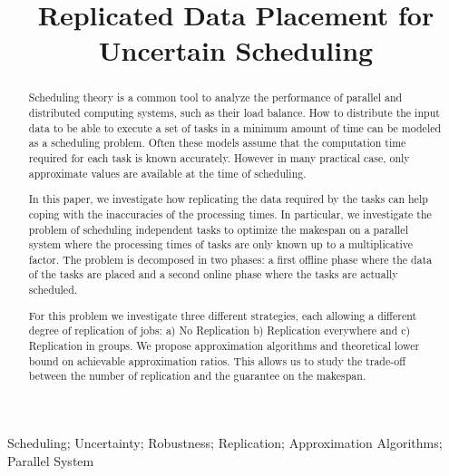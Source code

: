 \documentclass[10pt, conference, compsocconf]{IEEEtran}
\begin{document}
\title{Replicated Data Placement for Uncertain Scheduling}


\author{
}

\maketitle


\begin{abstract}
  Scheduling theory is a common tool to analyze the
  performance of parallel and distributed computing systems, such as their load
  balance. How to distribute the input data to be able to execute a
  set of tasks in a minimum amount of time can be modeled as a
  scheduling problem. Often these models assume that the computation
  time required for each task is known accurately. However in many
  practical case, only approximate values are available at the time of
  scheduling.

  In this paper, we investigate how replicating the data required by
  the tasks can help coping with the inaccuracies of the processing
  times. In particular, we investigate the problem of scheduling
  independent tasks to optimize the makespan on a parallel system
  where the processing times of tasks are only known up to a
  multiplicative factor. The problem is decomposed in two phases: a
  first offline phase where the data of the tasks are placed and a second
  online phase where the tasks are actually scheduled.

  For this problem we investigate three different strategies, each
  allowing a different degree of replication of jobs: a) No
  Replication b) Replication everywhere and c) Replication in
  groups. We propose approximation algorithms and theoretical lower
  bound on achievable approximation ratios.  This allows us to study
  the trade-off between the number of replication and the guarantee on
  the makespan.
\end{abstract}

\begin{IEEEkeywords}
Scheduling; Uncertainty; Robustness; Replication; Approximation Algorithms; Parallel System

\end{IEEEkeywords}
\end{document}
